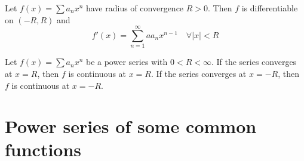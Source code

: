 \documentclass{notes}
\begin{document}
\begin{theorem}{}
	Let $f(x) =  \sum a_n x^n  $ have radius of convergence $R > 0$. Then $f$ is
	differentiable on $(-R, R)$ and
	$$f'(x) = \sum_{n=1}^{\infty} a a_n x^{n-1}\quad \forall |x| < R$$
\end{theorem}
\begin{theorem}{}
	Let $f(x) =  \sum a_n x^n  $ be a power series with $0<  R<\infty$. If the series converges at $x = R$, then $f$ is continuous
	at $x = R$. If the series converges at $x = -R$, then $f$ is continuous
	at $x = -R$.
\end{theorem}



\appendix
\addappheadtotoc
\chapter{Power series of some common functions} 
\end{document}
